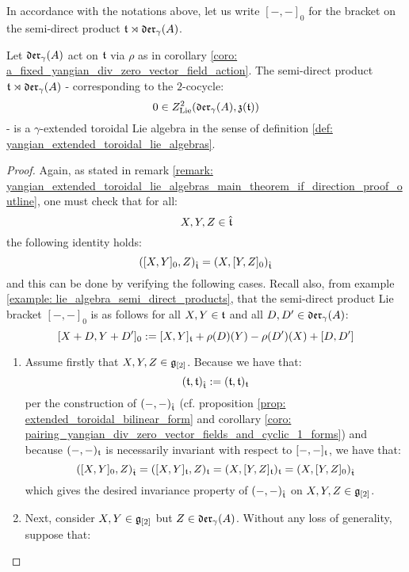         In accordance with the notations above, let us write $[-, -]_0$ for the bracket on the semi-direct product $\mathfrak{t} \rtimes \mathfrak{der}_{\gamma}(A)$.
        \begin{lemma} \label{lemma: semi_direct_product_of_toroidal_lie_algebras_with_div_zero_vector_fields_are_yangian_extended_toroidal_lie_algebras}
            Let $\mathfrak{der}_{\gamma}(A)$ act on $\mathfrak{t}$ via $\rho$ as in corollary \ref{coro: a_fixed_yangian_div_zero_vector_field_action}. The semi-direct product $\mathfrak{t} \rtimes \mathfrak{der}_{\gamma}(A)$ - corresponding to the $2$-cocycle:
                $$0 \in Z^2_{\mathrm{Lie}}(\mathfrak{der}_{\gamma}(A), \mathfrak{z}(\mathfrak{t}))$$
            - is a $\gamma$-extended toroidal Lie algebra in the sense of definition \ref{def: yangian_extended_toroidal_lie_algebras}.
        \end{lemma}
            \begin{proof}
                Again, as stated in remark \ref{remark: yangian_extended_toroidal_lie_algebras_main_theorem_if_direction_proof_outline}, one must check that for all:
                    $$X, Y, Z \in \hat{\mathfrak{t}}$$
                the following identity holds:
                    $$( [X, Y]_0, Z )_{\hat{\mathfrak{t}}} = ( X, [Y, Z]_0 )_{\hat{\mathfrak{t}}}$$
                and this can be done by verifying the following cases. Recall also, from example \ref{example: lie_algebra_semi_direct_products}, that the semi-direct product Lie bracket $[-, -]_0$ is as follows for all $X, Y \in \mathfrak{t}$ and all $D, D' \in \mathfrak{der}_{\gamma}(A)$:
                    $$[X + D, Y + D']_0 := [X, Y]_{\mathfrak{t}} + \rho(D)(Y) - \rho(D')(X) + [D, D']$$
                \begin{enumerate}
                    \item Assume firstly that $X, Y, Z \in \mathfrak{g}_{[2]}$. Because we have that:
                        $$(\mathfrak{t}, \mathfrak{t})_{\hat{\mathfrak{t}}} := (\mathfrak{t}, \mathfrak{t})_{\mathfrak{t}}$$
                    per the construction of $(-, -)_{\hat{\mathfrak{t}}}$ (cf. proposition \ref{prop: extended_toroidal_bilinear_form} and corollary \ref{coro: pairing_yangian_div_zero_vector_fields_and_cyclic_1_forms}) and because $(-, -)_{\mathfrak{t}}$ is necessarily invariant with respect to $[-, -]_{\mathfrak{t}}$, we have that:
                        $$( [X, Y]_0, Z )_{\hat{\mathfrak{t}}} = ( [X, Y]_{\mathfrak{t}}, Z )_{\mathfrak{t}} = ( X, [Y, Z]_{\mathfrak{t}} )_{\mathfrak{t}} = ( X, [Y, Z]_0 )_{\hat{\mathfrak{t}}}$$
                    which gives the desired invariance property of $(-, -)_{\hat{\mathfrak{t}}}$ on $X, Y, Z \in \mathfrak{g}_{[2]}$.
                    \item Next, consider $X, Y \in \mathfrak{g}_{[2]}$ but $Z \in \mathfrak{der}_{\gamma}(A)$. Without any loss of generality, suppose that:

\end{enumerate}
\end{proof}
